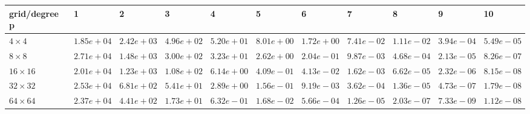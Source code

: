 \begin{tabular}{lllllllllll}
\hline
 grid/degree p   & 1          & 2          & 3          & 4          & 5          & 6          & 7          & 8          & 9          & 10         \\
\hline
 $4 \times 4$    & $1.85e+04$ & $2.42e+03$ & $4.96e+02$ & $5.20e+01$ & $8.01e+00$ & $1.72e+00$ & $7.41e-02$ & $1.11e-02$ & $3.94e-04$ & $5.49e-05$ \\
 $8 \times 8$    & $2.71e+04$ & $1.48e+03$ & $3.00e+02$ & $3.23e+01$ & $2.62e+00$ & $2.04e-01$ & $9.87e-03$ & $4.68e-04$ & $2.13e-05$ & $8.26e-07$ \\
 $16 \times 16$  & $2.01e+04$ & $1.23e+03$ & $1.08e+02$ & $6.14e+00$ & $4.09e-01$ & $4.13e-02$ & $1.62e-03$ & $6.62e-05$ & $2.32e-06$ & $8.15e-08$ \\
 $32 \times 32$  & $2.53e+04$ & $6.81e+02$ & $5.41e+01$ & $2.89e+00$ & $1.56e-01$ & $9.19e-03$ & $3.62e-04$ & $1.36e-05$ & $4.73e-07$ & $1.79e-08$ \\
 $64 \times 64$  & $2.37e+04$ & $4.41e+02$ & $1.73e+01$ & $6.32e-01$ & $1.68e-02$ & $5.66e-04$ & $1.26e-05$ & $2.03e-07$ & $7.33e-09$ & $1.12e-08$ \\
\hline
\end{tabular}